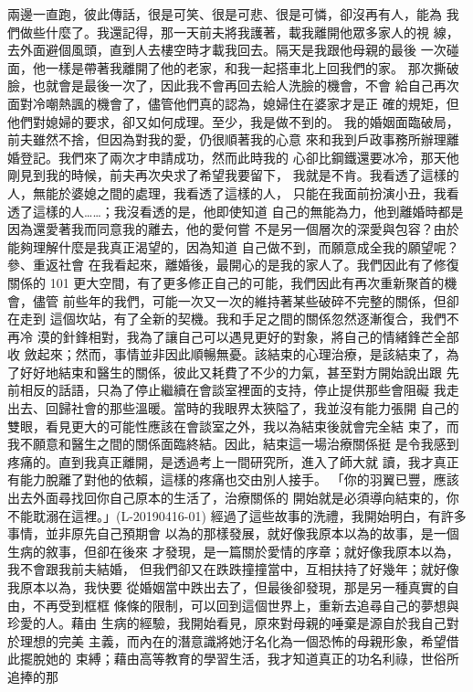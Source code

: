 兩邊一直跑，彼此傳話，很是可笑、很是可悲、很是可憐，卻沒再有人，能為
我們做些什麼了。我還記得，那一天前夫將我護著，載我離開他眾多家人的視
線，去外面避個風頭，直到人去樓空時才載我回去。隔天是我跟他母親的最後
一次碰面，他一樣是帶著我離開了他的老家，和我一起搭車北上回我們的家。
那次撕破臉，也就會是最後一次了，因此我不會再回去給人洗臉的機會，不會
給自己再次面對冷嘲熱諷的機會了，儘管他們真的認為，媳婦住在婆家才是正
確的規矩，但他們對媳婦的要求，卻又如何成理。至少，我是做不到的。 
我的婚姻面臨破局，前夫雖然不捨，但因為對我的愛，仍很順著我的心意
來和我到戶政事務所辦理離婚登記。我們來了兩次才申請成功，然而此時我的
心卻比鋼鐵還要冰冷，那天他剛見到我的時候，前夫再次央求了希望我要留下，
我就是不肯。我看透了這樣的人，無能於婆媳之間的處理，我看透了這樣的人，
只能在我面前扮演小丑，我看透了這樣的人……；我沒看透的是，他即使知道
自己的無能為力，他到離婚時都是因為還愛著我而同意我的離去，他的愛何嘗
不是另一個層次的深愛與包容？由於能夠理解什麼是我真正渴望的，因為知道
自己做不到，而願意成全我的願望呢？ 
參、重返社會 
在我看起來，離婚後，最開心的是我的家人了。我們因此有了修復關係的
101 
更大空間，有了更多修正自己的可能，我們因此有再次重新聚首的機會，儘管
前些年的我們，可能一次又一次的維持著某些破碎不完整的關係，但卻在走到
這個坎站，有了全新的契機。我和手足之間的關係忽然逐漸復合，我們不再冷
漠的針鋒相對，我為了讓自己可以遇見更好的對象，將自己的情緒鋒芒全部收
斂起來；然而，事情並非因此順暢無憂。該結束的心理治療，是該結束了，為
了好好地結束和醫生的關係，彼此又耗費了不少的力氣，甚至對方開始說出跟
先前相反的話語，只為了停止繼續在會談室裡面的支持，停止提供那些會阻礙
我走出去、回歸社會的那些溫暖。當時的我眼界太狹隘了，我並沒有能力張開
自己的雙眼，看見更大的可能性應該在會談室之外，我以為結束後就會完全結
束了，而我不願意和醫生之間的關係面臨終結。因此，結束這一場治療關係挺
是令我感到疼痛的。直到我真正離開，是透過考上一間研究所，進入了師大就
讀，我才真正有能力脫離了對他的依賴，這樣的疼痛也交由別人接手。 
「你的羽翼已豐，應該出去外面尋找回你自己原本的生活了，治療關係的
開始就是必須導向結束的，你不能耽溺在這裡。」(L-20190416-01) 
經過了這些故事的洗禮，我開始明白，有許多事情，並非原先自己預期會
以為的那樣發展，就好像我原本以為的故事，是一個生病的敘事，但卻在後來
才發現，是一篇關於愛情的序章；就好像我原本以為，我不會跟我前夫結婚，
但我們卻又在跌跌撞撞當中，互相扶持了好幾年；就好像我原本以為，我快要
從婚姻當中跌出去了，但最後卻發現，那是另一種真實的自由，不再受到框框
條條的限制，可以回到這個世界上，重新去追尋自己的夢想與珍愛的人。藉由
生病的經驗，我開始看見，原來對母親的唾棄是源自於我自己對於理想的完美
主義，而內在的潛意識將她汙名化為一個恐怖的母親形象，希望借此擺脫她的
束縛；藉由高等教育的學習生活，我才知道真正的功名利祿，世俗所追捧的那
